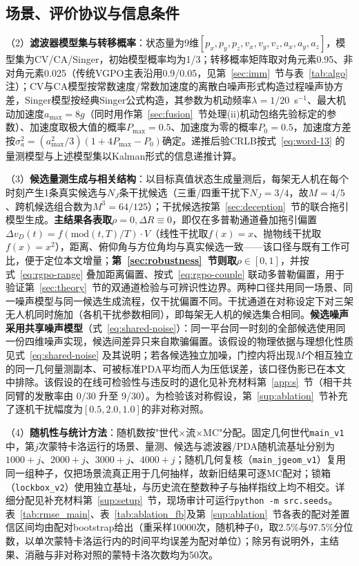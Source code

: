 \documentclass[UTF8,a4paper,zihao=-4]{ctexart}
\begin{document}
\subsection{场景、评价协议与信息条件}\label{sec:setup}
（2）\textbf{滤波器模型集与转移概率}：状态量为9维\([p_x,p_y,p_z,v_x,v_y,v_z,a_x,a_y,a_z]\)，模型集为CV/CA/Singer，初始模型概率均为1/3；转移概率矩阵取对角元素0.95、非对角元素0.025（传统VGPO主表沿用0.9/0.05，见第~\ref{sec:imm}~节与表~\ref{tab:algo} 注）；CV与CA模型按常数速度/常数加速度的离散白噪声形式构造过程噪声协方差，Singer模型按经典Singer公式\cite{singer1970}构造，其参数为机动频率\(\lambda=1/20\)~s\(^{-1}\)、最大机动加速度\(a_{\max}=8g\)（同时用作第~\ref{sec:fusion}~节处理(ii)机动包络先验标定的参数）、加速度取极大值的概率\(P_{\max}=0.5\)、加速度为零的概率\(P_0=0.5\)，加速度方差按\(\sigma_a^2=(a_{\max}^2/3)(1+4P_{\max}-P_0)\)确定。递推后验CRLB按式~\eqref{eq:word-13} 的量测模型与上述模型集以Kalman形式的信息递推计算。

（3）\textbf{候选量测生成与相关结构}：以目标真值状态生成量测后，每架无人机在每个时刻产生1条真实候选与\(N_J\)条干扰候选（三重/四重干扰下\(N_J=3/4\)，故\(M=4/5\)、跨机候选组合数为\(M^3=64/125\)）；干扰候选按第~\ref{sec:deception}~节的联合拖引模型生成。\textbf{主结果各表取\(\rho=0,\Delta R\equiv0\)}，即仅在多普勒通道叠加拖引偏置\(\Delta v_D(t)=f\!\left(\mathrm{mod}(t,T)/T\right)\cdot V\)（线性干扰取\(f(x)=x\)、抛物线干扰取\(f(x)=x^2\)），距离、俯仰角与方位角均与真实候选一致——该口径与既有工作可比，便于定位本文增量；\textbf{第~\ref{sec:robustness}~节则取\(\rho\in[0,1]\)}，并按式~\eqref{eq:rgpo-range} 叠加距离偏置、按式~\eqref{eq:rgpo-couple} 联动多普勒偏置，用于验证第~\ref{sec:theory}~节的双通道检验与可辨识性边界。两种口径共用同一场景、同一噪声模型与同一候选生成流程，仅干扰偏置不同。干扰通道在对称设定下对三架无人机同时施加（各机干扰参数相同），即每架无人机的候选集合相同。\textbf{候选噪声采用共享噪声模型}（式~\eqref{eq:shared-noise}）：同一平台同一时刻的全部候选使用同一份四维噪声实现，候选间差异只来自欺骗偏置。该假设的物理依据与理想化性质见式~\eqref{eq:shared-noise} 及其说明；若各候选独立加噪，门控内将出现\(M\)个相互独立的同一几何量测副本、可被标准PDA平均而人为压低误差，该口径伪影已在本文中排除。该假设的在线可检验性与违反时的退化见补充材料第~\ref{app:s}~节（相干共同臂的发散率由 0/30 升至 9/30）。为检验该对称假设，第~\ref{sup:ablation}~节补充了逐机干扰幅度为\([0.5,2.0,1.0]\)的非对称对照。

（4）\textbf{随机性与统计方法}：随机数按"世代$\times$流$\times$MC"分配。固定几何世代\texttt{main\_v1}中，第\(j\)次蒙特卡洛运行的场景、量测、候选与滤波器/PDA随机流基址分别为\(1000+j\)、\(2000+j\)、\(3000+j\)、\(4000+j\)；随机几何复核（\texttt{main\_jgeom\_v1}）复用同一组种子，仅把场景流真正用于几何抽样，故新旧结果可逐MC配对；锁箱（\texttt{lockbox\_v2}）使用独立基址，与历史流在整数种子与抽样指纹上均不相交。详细分配见补充材料第~\ref{sup:setup}~节，现场审计可运行\texttt{python -m src.seeds}。表~\ref{tab:rmse_main}、表~\ref{tab:ablation_fb}及第~\ref{sup:ablation}~节各表的配对差置信区间均由配对bootstrap给出（重采样10000次，随机种子0，取2.5\%与97.5\%分位数，以单次蒙特卡洛运行内的时间平均误差为配对单位）；除另有说明外，主结果、消融与非对称对照的蒙特卡洛次数均为50次。
\end{document}
